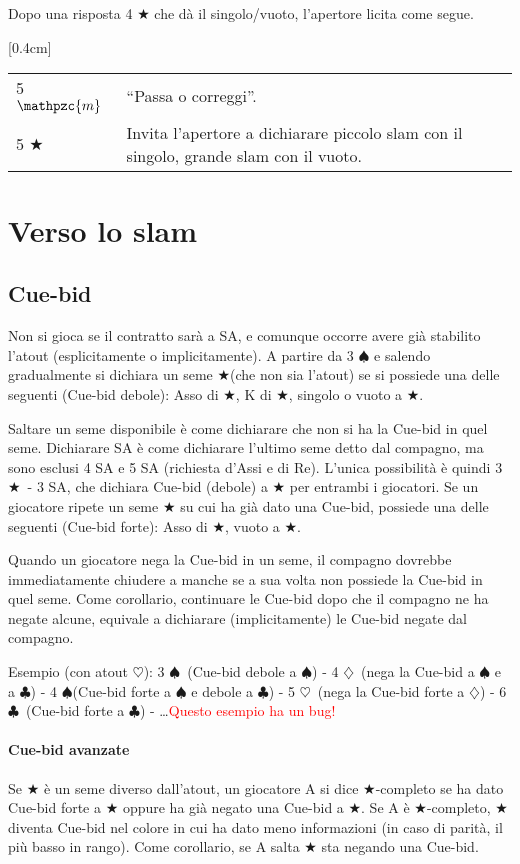 \documentclass[a4paper,10pt]{article}
\renewcommand{\c}{$\clubsuit$\xspace}
\renewcommand{\d}{$\diamondsuit$\xspace}
\newcommand{\h}{$\heartsuit$\xspace}
\newcommand{\s}{$\spadesuit$\xspace}
\renewcommand{\j}{$\bigstar$\xspace}
\newcommand{\sa}{SA\xspace}
\newcommand{\m}{$\mathpzc{m}$\xspace}
\newcommand{\smallspace}{\vskip0.3cm}
\renewcommand{\tabcolsep}{0.3cm}
\newcommand{\note}[1]{\textcolor{red}{#1}}
\newenvironment{twocol}
  {\smallspace\noindent\begin{tabular}{l p{0.78\textwidth}}}
  {\end{tabular}\smallspace}
\newcommand{\biddingtable}[2][0.4cm]{
  \needspace{1cm}
  \marginnote{
    \scriptsize{
    \def\arraystretch{1.5}
    \renewcommand{\tabcolsep}{0.1cm}
    \begin{tabular}{|>{\centering\arraybackslash}p{0.6cm}>{\centering\arraybackslash}p{0.6cm}>{\centering\arraybackslash}p{0.6cm}>{\centering\arraybackslash}p{0.6cm}|}
      \hline
      #2
    \end{tabular}
    }
  }[#1]
}
\begin{document}
Dopo una risposta 4 \j che dà il singolo/vuoto, l'apertore licita come segue.

\biddingtable{3 \sa & P & 4 \d & P \\ 4 \j & P & * &}
\begin{twocol}
 5 \m & ``Passa o correggi''.\\
 5 \j & Invita l'apertore a dichiarare piccolo slam con il singolo, grande slam con il vuoto.
\end{twocol}


\pagebreak

\section{Verso lo slam}

\subsection{Cue-bid}

Non si gioca se il contratto sarà a SA, e comunque occorre avere già stabilito l'atout (esplicitamente o implicitamente). A partire da 3 \s e salendo gradualmente si dichiara un seme \j (che non sia l'atout) se si possiede una delle seguenti (Cue-bid debole): Asso di \j, K di \j, singolo o vuoto a \j.

Saltare un seme disponibile è come dichiarare che non si ha la Cue-bid in quel seme. Dichiarare SA è come dichiarare l'ultimo seme detto dal compagno, ma sono esclusi 4 SA e 5 SA (richiesta d'Assi e di Re). L'unica possibilità è quindi 3 \j\ - 3 SA, che dichiara Cue-bid (debole) a \j per entrambi i giocatori. Se un giocatore ripete un seme \j su cui ha già dato una Cue-bid, possiede una delle seguenti (Cue-bid forte): Asso di \j, vuoto a \j.

Quando un giocatore nega la Cue-bid in un seme, il compagno dovrebbe immediatamente chiudere a manche se a sua volta non possiede la Cue-bid in quel seme.
Come corollario, continuare le Cue-bid dopo che il compagno ne ha negate alcune, equivale a dichiarare (implicitamente) le Cue-bid negate dal compagno.

Esempio (con atout \h): 3 \s\  (Cue-bid debole a \s) - 4 \d\ (nega la Cue-bid a \s e a \c) - 4 \s (Cue-bid forte a \s e debole a \c) - 5 \h\ (nega la Cue-bid forte a \d) - 6 \c\ (Cue-bid forte a \c) - \dots \note{Questo esempio ha un bug!}

\paragraph{Cue-bid avanzate} Se \j è un seme diverso dall'atout, un giocatore A si dice \j-completo se ha dato Cue-bid forte a \j oppure ha già negato una Cue-bid a \j. Se A è \j-completo, \j diventa Cue-bid nel colore in cui ha dato meno informazioni (in caso di parità, il più basso in rango). Come corollario, se A salta \j sta negando una Cue-bid.
\vspace{4mm}
\end{document}
